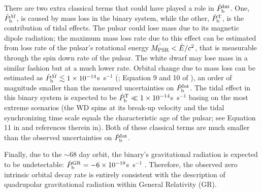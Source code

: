 There are two extra classical terms that could have played a role in
$\dot{P}_{\rm b}^{\rm Int}$. One, $\dot{P}_{\rm b}^{\dot{M}}$, is caused by mass loss in the
binary system, while the other, $\dot{P}_{\rm b}^{\rm T}$, is the contribution of tidal effects.
The pulsar could lose mass due to its magnetic dipole radiation; the maximum
mass loss rate due to this effect can be estimated from loss rate of the
pulsar's rotational energy $\dot{M_{\rm PSR}}<\dot{E}/c^2$, that is
measurable through the spin down rate of the pulsar.
The white dwarf may lose mass in a similar fashion but at a much lower rate.
Orbital change due to mass loss can be estimated as $\dot{P}_{\rm
b}^{\dot{M}}\lesssim 1\times10^{-14}$s~s$^{-1}$ (\citealt{dt91}; Equation 9 and 10
of \citealt{fwe+12}), an order of magnitude smaller than the measured
uncertainties on $\dot{P}_{\rm b}^{\rm Int}$.
The tidal effect in this binary system is expected to be $\dot{P}_{\rm b}^{\rm
T}\ll1\times10^{-14}$s~s$^{-1}$ basing on the most extreme scenarios (the WD spins at its break-up velocity and the tidal synchronizing time scale equals the
characteristic age of the pulsar; see Equation 11 in \citealt{fwe+12} and
references therein in).
Both of these classical terms are much smaller than the observed uncertainties
on $\dot{P}_{\rm b}^{\rm Int}$.


Finally, due to the $\sim$68 day orbit, the binary's gravitational
radiation is expected to be undetectable: $\dot{P}_{\rm b}^{\rm GR} =
-6\times10^{-18}$s~s$^{-1}$ \citep{lk05}.  Therefore, the observed
zero intrinsic orbital decay rate is entirely consistent with the
description of quadrupolar gravitational radiation within General
Relativity (GR).


